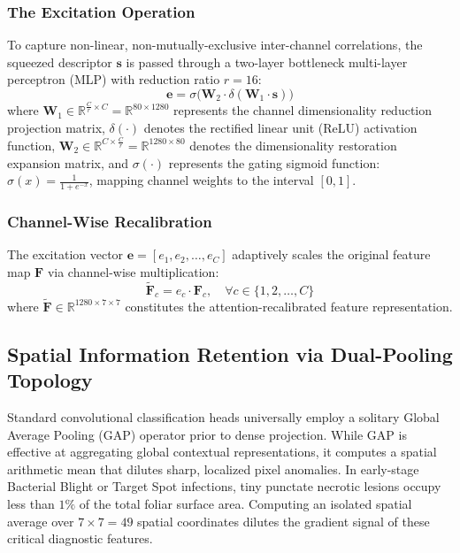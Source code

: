 \documentclass[journal,10pt,twocolumn]{IEEEtran}
\begin{document}
\subsubsection{The Excitation Operation}
To capture non-linear, non-mutually-exclusive inter-channel correlations, the squeezed descriptor $\mathbf{s}$ is passed through a two-layer bottleneck multi-layer perceptron (MLP) with reduction ratio $r = 16$:
\begin{equation}
\mathbf{e} = \sigma\Big(\mathbf{W}_2 \cdot \delta(\mathbf{W}_1 \cdot \mathbf{s})\Big)
\end{equation}
where $\mathbf{W}_1 \in \mathbb{R}^{\frac{C}{r} \times C} = \mathbb{R}^{80 \times 1280}$ represents the channel dimensionality reduction projection matrix, $\delta(\cdot)$ denotes the rectified linear unit (ReLU) activation function, $\mathbf{W}_2 \in \mathbb{R}^{C \times \frac{C}{r}} = \mathbb{R}^{1280 \times 80}$ denotes the dimensionality restoration expansion matrix, and $\sigma(\cdot)$ represents the gating sigmoid function: $\sigma(x) = \frac{1}{1 + e^{-x}}$, mapping channel weights to the interval $[0, 1]$.

\subsubsection{Channel-Wise Recalibration}
The excitation vector $\mathbf{e} = [e_1, e_2, \dots, e_C]$ adaptively scales the original feature map $\mathbf{F}$ via channel-wise multiplication:
\begin{equation}
\widetilde{\mathbf{F}}_c = e_c \cdot \mathbf{F}_c, \quad \forall c \in \{1, 2, \dots, C\}
\end{equation}
where $\widetilde{\mathbf{F}} \in \mathbb{R}^{1280 \times 7 \times 7}$ constitutes the attention-recalibrated feature representation.

\subsection{Spatial Information Retention via Dual-Pooling Topology}
Standard convolutional classification heads universally employ a solitary Global Average Pooling (GAP) operator prior to dense projection. While GAP is effective at aggregating global contextual representations, it computes a spatial arithmetic mean that dilutes sharp, localized pixel anomalies. In early-stage Bacterial Blight or Target Spot infections, tiny punctate necrotic lesions occupy less than $1\%$ of the total foliar surface area. Computing an isolated spatial average over $7 \times 7 = 49$ spatial coordinates dilutes the gradient signal of these critical diagnostic features.
\end{document}
